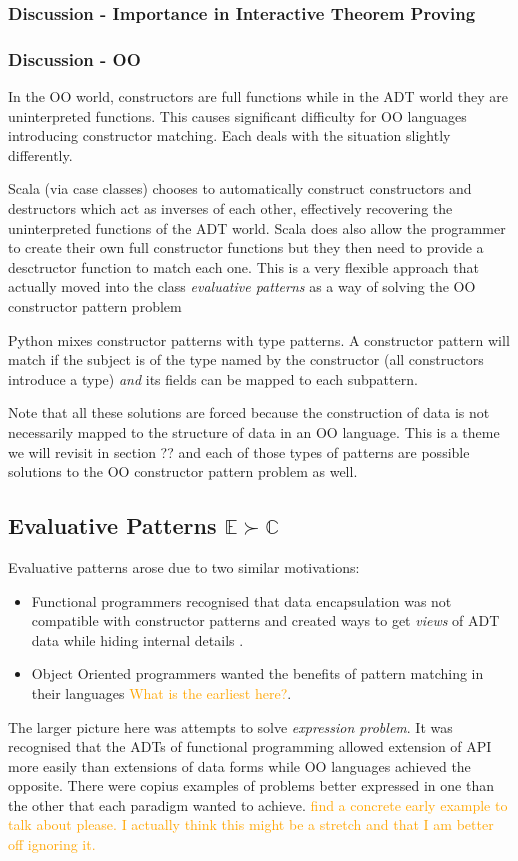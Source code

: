 \documentclass[acmsmall]{acmart}
\renewcommand\todo[1]{\textcolor{orange}{#1}}
\begin{document}
\subsubsection{Discussion - Importance in Interactive Theorem Proving}

\subsubsection{Discussion - OO}
\label{sec:oo_constructors}

In the OO world, constructors are full functions while in the ADT world they are uninterpreted functions.  This causes significant difficulty for OO languages introducing constructor matching.  Each deals with the situation slightly differently.

Scala (via case classes) chooses to automatically construct constructors and destructors which act as inverses of each other, effectively recovering the uninterpreted functions of the ADT world.  Scala does also allow the programmer to create their own full constructor functions but they then need to provide a desctructor function to match each one.  This is a very flexible approach that actually moved into the class \emph{evaluative patterns} as a way of solving the OO constructor pattern problem

Python mixes constructor patterns with type patterns.  A constructor pattern will match if the subject is of the type named by the constructor (all constructors introduce a type) \emph{and} its fields can be mapped to each subpattern.

Note that all these solutions are forced because the construction of data is not necessarily mapped to the structure of data in an OO language.  This is a theme we will revisit in section ?? and each of those types of patterns are possible solutions to the OO constructor pattern problem as well.

\subsection{Evaluative Patterns $\mathbb{E} \succ \mathbb{C}$}
\label{sec:evaluative}

Evaluative patterns arose due to two similar motivations:
\begin{itemize}
  \item Functional programmers recognised that data encapsulation was not compatible with constructor patterns and created ways to get \emph{views} of ADT data while hiding internal details \cite{wadler_views:_1987}.
  \item Object Oriented programmers wanted the benefits of pattern matching in their languages \todo{What is the earliest here?}.
\end{itemize}
The larger picture here was attempts to solve \emph{expression problem}.  It was recognised that the ADTs of functional programming allowed extension of API more easily than extensions of data forms while OO languages achieved the opposite.  There were copius examples of problems better expressed in one than the other that each paradigm wanted to achieve. \todo{find a concrete early example to talk about please.  I actually think this might be a stretch and that I am better off ignoring it.}
\end{document}
